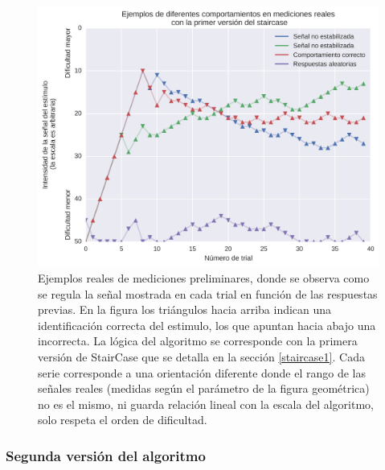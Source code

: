 \documentclass{article}
\begin{document}
    \begin{figure}
        \center
        \includegraphics[width=\textwidth]{Imagenes/StairCase1.png}
        \caption{Ejemplos reales de mediciones preliminares, donde se observa como se regula la señal mostrada en cada trial en función de las respuestas previas. En la figura los triángulos hacia arriba indican una identificación correcta del estimulo, los que apuntan hacia abajo una incorrecta. La lógica del algoritmo se corresponde con la primera versión de StairCase que se detalla en la sección \ref{staircase1}. Cada serie corresponde a una orientación diferente donde el rango de las señales reales (medidas según el parámetro de la figura geométrica) no es el mismo, ni guarda relación lineal con la escala del algoritmo, solo respeta el orden de dificultad.}
        \label{fig:staircase1}
    \end{figure}    

    \subsubsection{Segunda versión del algoritmo} \label{staircase2}
    
\end{document}
